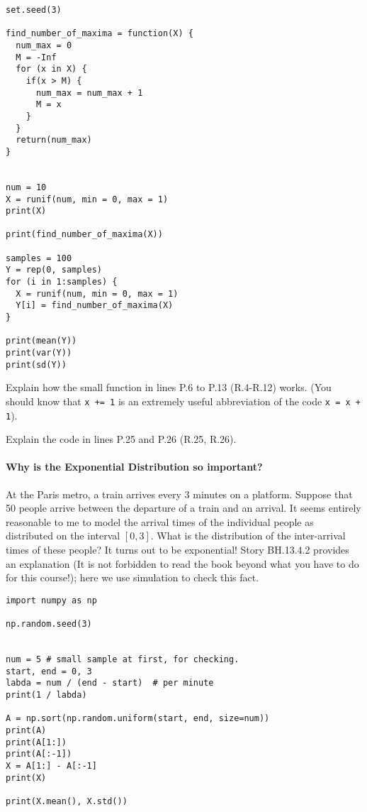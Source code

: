 \documentclass[assignments]{subfiles}
\begin{document}
\begin{verbatim}
set.seed(3)

find_number_of_maxima = function(X) {
  num_max = 0
  M = -Inf
  for (x in X) {
    if(x > M) {
      num_max = num_max + 1
      M = x
    }
  }
  return(num_max)
}


num = 10
X = runif(num, min = 0, max = 1)
print(X)

print(find_number_of_maxima(X))

samples = 100
Y = rep(0, samples)
for (i in 1:samples) {
  X = runif(num, min = 0, max = 1)
  Y[i] = find_number_of_maxima(X)
}

print(mean(Y))
print(var(Y))
print(sd(Y))
\end{verbatim}

\begin{exercise}
Explain how the small function in lines P.6 to P.13 (R.4-R.12) works.
(You should know that \texttt{x += 1} is an extremely useful abbreviation of the code \texttt{x = x + 1}).
\begin{solution}
\end{solution}
\end{exercise}

\begin{exercise}
Explain the code in lines P.25 and P.26 (R.25, R.26).
\begin{solution}
\end{solution}
\end{exercise}

\paragraph{Why is the Exponential Distribution so important?}

At the Paris metro, a train arrives every 3 minutes on a platform.
Suppose that 50 people arrive between the departure of a train and an arrival.
It seems entirely reasonable to me to model the arrival times of the individual people as distributed on the interval \([0,3]\).
What is the distribution of the inter-arrival times of these people?
It turns out to be exponential!
Story BH.13.4.2 provides an explanation (It is not forbidden to read the book beyond what you have to do for this course!); here we use simulation to check this fact.



\begin{verbatim}
import numpy as np

np.random.seed(3)


num = 5 # small sample at first, for checking.
start, end = 0, 3
labda = num / (end - start)  # per minute
print(1 / labda)

A = np.sort(np.random.uniform(start, end, size=num))
print(A)
print(A[1:])
print(A[:-1])
X = A[1:] - A[:-1]
print(X)

print(X.mean(), X.std())
\end{verbatim}
\end{document}
